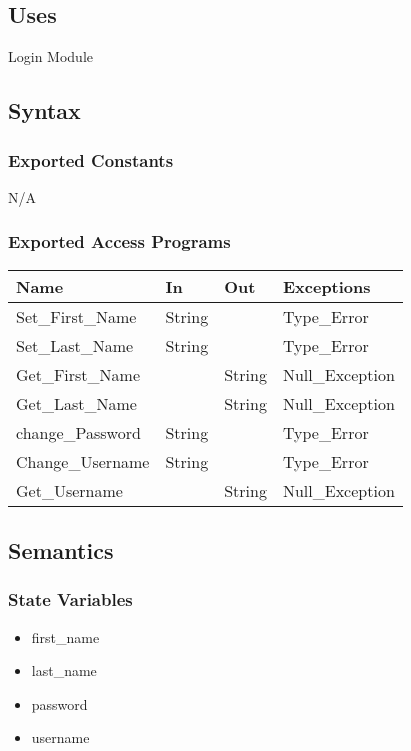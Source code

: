 \documentclass[12pt, titlepage]{article}
\begin{document}
\subsection{Uses}
Login Module
\subsection{Syntax}

\subsubsection{Exported Constants}
N/A

\subsubsection{Exported Access Programs}

\begin{center}
\begin{tabular}{p{4cm} p{4cm} p{4cm} p{4cm}}
\hline
\textbf{Name} & \textbf{In} & \textbf{Out} & \textbf{Exceptions} \\
\hline
Set\_First\_Name & String &  & Type\_Error \\
\hline
Set\_Last\_Name & String &  &  Type\_Error\\
\hline
Get\_First\_Name &  & String & Null\_Exception \\
\hline
Get\_Last\_Name &  & String & Null\_Exception \\
\hline
change\_Password & String &  & Type\_Error \\
\hline
Change\_Username & String &  &  Type\_Error\\
\hline
Get\_Username &  & String & Null\_Exception\\
\hline
\end{tabular}
\end{center}

\subsection{Semantics}

\subsubsection{State Variables}

\begin{itemize}
  \item first\_name
  \item last\_name
  \item password
  \item username
\end{itemize}
\end{document}
